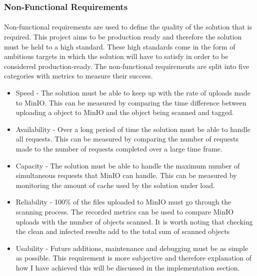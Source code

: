 \documentclass[12pt, conference, final, a4paper, onecolumn, compsoc]{IEEEtran}
\begin{document}



    \subsubsection*{Non-Functional Requirements}
    \paragraph{}

    Non-functional requirements are used to define the quality of the solution
    that is required. This project aims to be production ready and therefore the
    solution must be held to a high standard. These high standards come in the
    form of ambitious targets in which the solution will have to satisfy in
    order to be considered production-ready. The non-functional requirements are
    split into five categories with metrics to measure their success.

    \begin{itemize}
      \item Speed - The solution must be able to keep up with the rate of
            uploads made to MinIO. This can be measured by comparing the time
            difference between uploading a object to MinIO and the object being
            scanned and tagged.
      \item Availability - Over a long period of time the solution must be able
            to handle all requests. This can be measured by comparing the number
            of requests made to the number of requests completed over a large
            time frame.
      \item Capacity - The solution must be able to handle the maximum number of
            simultaneous requests that MinIO can handle. This can be measured by
            monitoring the amount of cache used by the solution under load.
      \item Reliability - 100\% of the files uploaded to MinIO must go through
            the scanning process. The recorded metrics can be used to compare
            MinIO uploads with the number of objects scanned. It is worth noting
            that checking the clean and infected results add to the total sum of
            scanned objects
      \item Usability - Future additions, maintenance and debugging must be as
            simple as possible. This requirement is more subjective and
            therefore explanation of how I have achieved this will be discussed
            in the implementation section.
    \end{itemize}
\end{document}
